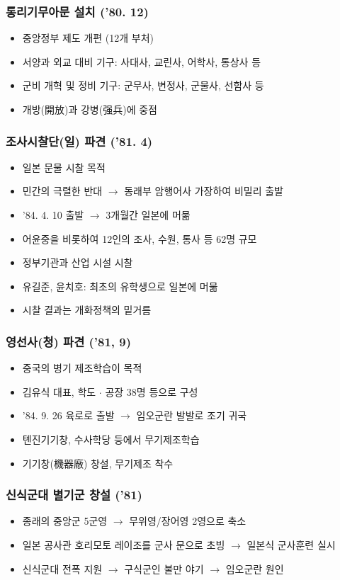 \subsubsection*{통리기무아문 설치 ('80. 12)}
\begin{itemize}
    \item 중앙정부 제도 개편 (12개 부처)
    \item 서양과 외교 대비 기구: 사대사, 교린사, 어학사, 통상사 등
    \item 군비 개혁 및 정비 기구: 군무사, 변정사, 군물사, 선함사 등
    \item 개방(開放)과 강병(强兵)에 중점
\end{itemize}

\subsubsection*{조사시찰단(일) 파견 ('81. 4)}
\begin{itemize}
    \item 일본 문물 시찰 목적
    \item 민간의 극렬한 반대 $\rightarrow$ 동래부 암행어사 가장하여 비밀리 출발
    \item '84. 4. 10 출발 $\rightarrow$ 3개월간 일본에 머묾
    \item 어윤중을 비롯하여 12인의 조사, 수원, 통사 등 62명 규모
    \item 정부기관과 산업 시설 시찰
    \item 유길준, 윤치호: 최초의 유학생으로 일본에 머묾
    \item 시찰 결과는 개화정책의 밑거름
\end{itemize}
\newpage

\subsubsection*{영선사(청) 파견 ('81, 9)}
\begin{itemize}
    \item 중국의 병기 제조학습이 목적
    \item 김유식 대표, 학도 $\cdot$ 공장 38명 등으로 구성
    \item '84. 9. 26 육로로 출발 $\rightarrow$ 임오군란 발발로 조기 귀국
    \item 톈진기기창, 수사학당 등에서 무기제조학습
    \item 기기창(機器廠) 창설, 무기제조 착수
\end{itemize}

\subsubsection*{신식군대 별기군 창설 ('81)}
\begin{itemize}
    \item 종래의 중앙군 5군영 $\rightarrow$ 무위영/장어영 2영으로 축소
    \item 일본 공사관 호리모토 레이조를 군사 문으로 초빙 $\rightarrow$ 일본식 군사훈련 실시
    \item 신식군대 전폭 지원 $\rightarrow$ 구식군인 불만 야기 $\rightarrow$ 임오군란 원인
\end{itemize}

